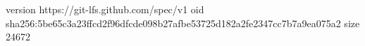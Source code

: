 version https://git-lfs.github.com/spec/v1
oid sha256:5be65c3a23ffcd2f96dfcde098b27afbe53725d182a2fe2347cc7b7a9ea075a2
size 24672
